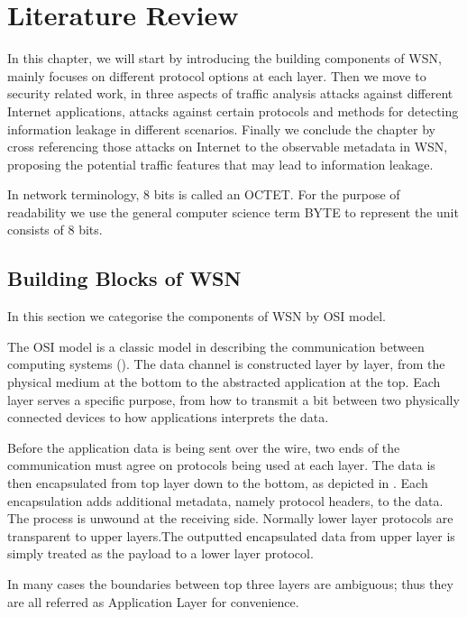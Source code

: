 \chapter{Literature Review} \label{Chp: LiteratureReview}

In this chapter, we will start by introducing the building components of WSN, mainly focuses on different protocol options at each layer. Then we move to security related work, in three aspects of traffic analysis attacks against different Internet applications, attacks against certain protocols and methods for detecting information leakage in different scenarios. Finally we conclude the chapter by cross referencing those  attacks on Internet to the observable metadata in WSN, proposing the potential traffic features that may lead to information leakage.

In network terminology, 8 bits is called an OCTET. For the purpose of readability we use the general computer science term BYTE to represent the unit consists of 8 bits.

\section{Building Blocks of WSN}
In this section we categorise the components of WSN by OSI model\cite{OSI}.

The OSI model is a classic model in describing the communication between computing systems (). The data channel is constructed layer by layer, from the physical medium at the bottom to the abstracted application at the top. Each layer serves a specific purpose, from how to transmit a bit between two physically connected devices to how applications interprets the data.

Before the application data is being sent over the wire, two ends of the communication must agree on protocols being used at each layer. The data is then encapsulated from top layer down to the bottom, as depicted in . Each encapsulation adds additional metadata, namely protocol headers, to the data. The process is unwound at the receiving side. Normally lower layer protocols are transparent to upper layers.The outputted encapsulated data from upper layer is simply treated as the payload to a lower layer protocol.

In many cases the boundaries between top three layers are ambiguous; thus they are all referred as Application Layer for convenience.

